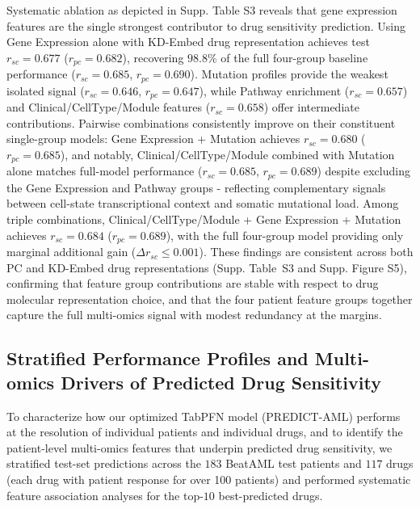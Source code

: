 \documentclass[pdflatex,sn-mathphys-num]{sn-jnl}
\theoremstyle{thmstyleone}
\theoremstyle{thmstyletwo}
\theoremstyle{thmstylethree}
\begin{document}
Systematic ablation as depicted in Supp. Table S3 reveals that gene expression features are the single strongest contributor to drug sensitivity prediction. Using Gene Expression alone with KD-Embed drug representation achieves test $r_{sc} = 0.677$ ($r_{pc} = 0.682$), recovering $98.8\%$ of the full four-group baseline performance ($r_{sc} = 0.685$, $r_{pc} = 0.690$). Mutation profiles provide the weakest isolated signal ($r_{sc} = 0.646$, $r_{pc} = 0.647$), while Pathway enrichment ($r_{sc} = 0.657$) and Clinical/CellType/Module features ($r_{sc} = 0.658$) offer intermediate contributions. Pairwise combinations consistently improve on their constituent single-group models: Gene Expression + Mutation achieves $r_{sc} = 0.680$ ($r_{pc} = 0.685$), and notably, Clinical/CellType/Module combined with Mutation alone matches full-model performance ($r_{sc} = 0.685$, $r_{pc} = 0.689$) despite excluding the Gene Expression and Pathway groups - reflecting complementary signals between cell-state transcriptional context and somatic mutational load. Among triple combinations, Clinical/CellType/Module + Gene Expression + Mutation achieves $r_{sc} = 0.684$ ($r_{pc} = 0.689$), with the full four-group model providing only marginal additional gain ($\Delta r_{sc} \leq 0.001$). These findings are consistent across both PC and KD-Embed drug representations (Supp. Table~S3 and Supp. Figure S5), confirming that feature group contributions are stable with respect to drug molecular representation choice, and that the four patient feature groups together capture the full multi-omics signal with modest redundancy at the margins.
\subsection{Stratified Performance Profiles and Multi-omics Drivers of Predicted Drug Sensitivity}\label{sec3.5}

To characterize how our optimized TabPFN model (PREDICT-AML) performs at the resolution of individual patients and individual drugs, and to identify the patient-level multi-omics features that underpin predicted drug sensitivity, we stratified test-set predictions across the $183$ BeatAML test patients and $117$ drugs (each drug with patient response for over 100 patients) and performed systematic feature association analyses for the top-$10$ best-predicted drugs.
\end{document}
